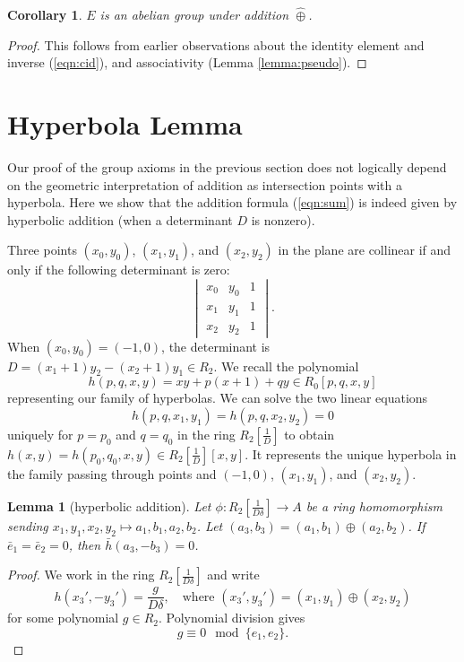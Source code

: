 \documentclass[18pt]{article}
\newtheorem{lemma}[theorem]{Lemma}
\newtheorem{corollary}[theorem]{Corollary}
\newcommand{\f}[1]{\frac{1}{#1}}
\newcommand{\hplus}{\hat\oplus}
\def\cong{\equiv}
\begin{document}
\begin{corollary} $E$ is an abelian group under addition $\hplus$.
\end{corollary}

\begin{proof} This follows from earlier observations about the 
  identity element and inverse (\ref{eqn:cid}),
  and associativity (Lemma \ref{lemma:pseudo}).
\end{proof}

\section{Hyperbola Lemma}

Our proof of the group axioms in the previous section does not
logically depend on the geometric interpretation of addition as
intersection points with a hyperbola.  Here we show that the addition
formula (\ref{eqn:sum}) is indeed given by hyperbolic addition (when a
determinant $D$ is nonzero).

Three points $(x_0,y_0)$, $(x_1,y_1)$, and $(x_2,y_2)$ in the plane
are collinear if and only if the following determinant is zero:
\[
\begin{vmatrix}
x_0 & y_0 & 1\\
x_1 & y_1 & 1\\
x_2 & y_2 & 1
\end{vmatrix}.
\]
When $(x_0,y_0) = (-1,0)$, the determinant
is $D= (x_1+1) y_2 - (x_2+1) y_1\in R_2$. 
We recall the polynomial
\[
h(p,q,x,y) = x y + p (x+1) + q y \in R_0[p,q,x,y]
\]
representing our family of hyperbolas.
We can solve the two linear equations
\[
h(p,q,x_1,y_1)=h(p,q,x_2,y_2)=0
\]
uniquely for $p=p_0$ and $q=q_0$ in the ring $R_2[\f{D}]$ to obtain
$h(x,y) = h(p_0,q_0,x,y) \in R_2[\f{D}][x,y]$.  It represents the
unique hyperbola in the family passing through points and $(-1,0)$,
$(x_1,y_1)$, and $(x_2,y_2)$.
 
\begin{lemma}[hyperbolic addition]\label{lemma:hyperbola}
  Let $\phi:R_2[\f{D\delta}]\to A$ be a ring homomorphism sending
  $x_1,y_1,x_2,y_2\mapsto a_1,b_1,a_2,b_2$.  Let $(a_3,b_3) =
  (a_1,b_1)\oplus (a_2,b_2)$.  If $\bar e_1 = \bar e_2 = 0$, then
  $\bar h(a_3,-b_3) = 0$.
\end{lemma}

\begin{proof}
  We work in the ring $R_2[\f{D\delta}]$ and write
\[
h(x_3',-y_3') = \frac{g}{D\delta},\quad 
\text{where } (x_3',y_3') = (x_1,y_1)\oplus (x_2,y_2)
\]
for some polynomial $g \in R_2$.  Polynomial division gives
\begin{equation}\label{eqn:h}
g \cong 0 \mod \{e_1,e_2\}.
\end{equation}
\end{proof}
\end{document}
